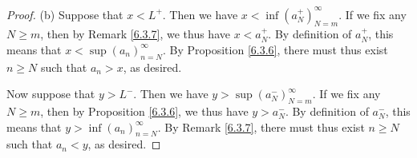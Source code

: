 \begin{proof}{(b)}
    Suppose that \(x < L^+\).
    Then we have \(x < \inf(a_N^+)_{N = m}^\infty\).
    If we fix any \(N \geq m\), then by Remark \ref{6.3.7}, we thus have \(x < a_N^+\).
    By definition of \(a_N^+\), this means that \(x < \sup(a_n)_{n = N}^\infty\).
    By Proposition \ref{6.3.6}, there must thus exist \(n \geq N\) such that \(a_n > x\), as desired.

    Now suppose that \(y > L^-\).
    Then we have \(y > \sup(a_N^-)_{N = m}^\infty\).
    If we fix any \(N \geq m\), then by Proposition \ref{6.3.6}, we thus have \(y > a_N^-\).
    By definition of \(a_N^-\), this means that \(y > \inf(a_n)_{n = N}^\infty\).
    By Remark \ref{6.3.7}, there must thus exist \(n \geq N\) such that \(a_n < y\), as desired.
\end{proof}

